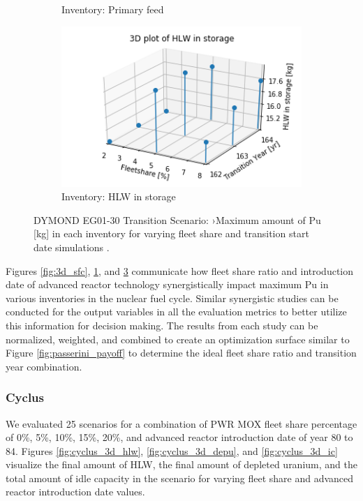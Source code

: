 \begin{figure}[]
\begin{subfigure}[t]{0.58\textwidth}
        \caption{Inventory: Primary feed}
	    \label{fig:3d_pf}
    \end{subfigure}
    \begin{subfigure}[t]{0.58\textwidth}
        \centering
        \includegraphics[width=\linewidth]{figures/3d_hlw} 
        \caption{Inventory: HLW in storage}
        \label{fig:3d_hlw}
    \end{subfigure}
    \caption{DYMOND EG01-30 Transition Scenario: ›Maximum amount of Pu [kg] in each inventory for varying fleet share and transition start date simulations \cite{chee_gwenchee/ddwrapper_2019}.}
\end{figure}

Figures \ref{fig:3d_sfc}, \ref{fig:3d_pf}, and \ref{fig:3d_hlw}
communicate how fleet share ratio and introduction date of advanced 
reactor technology 
synergistically impact maximum Pu in various inventories in the 
nuclear fuel cycle. 
Similar synergistic studies can be conducted for the output variables in 
all the evaluation metrics to better utilize this information for decision making. 
The results from each study can be normalized, weighted, and 
combined to create an optimization surface similar 
to Figure \ref{fig:passerini_payoff} to determine the ideal fleet share 
ratio and transition year combination. 

\subsubsection{\textbf{Cyclus}}
We evaluated 25 scenarios for a combination of PWR MOX fleet share percentage 
of 0\%, 5\%, 10\%, 15\%, 20\%, and advanced reactor introduction 
date of year 80 to 84.
Figures \ref{fig:cyclus_3d_hlw}, \ref{fig:cyclus_3d_depu}, and 
\ref{fig:cyclus_3d_ic}
visualize the final amount of HLW, the final amount of depleted uranium, 
and the total amount of idle capacity in the scenario for varying 
fleet share and advanced reactor introduction date values. 

